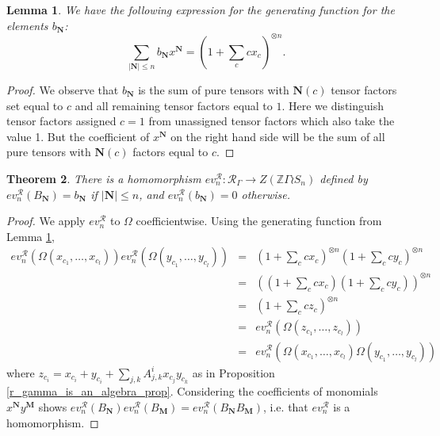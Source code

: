\documentclass[10pt]{article}
\newtheorem{theorem}{Theorem}[section]
\newtheorem{lemma}[theorem]{Lemma}
\theoremstyle{definition}
\newcommand{\RGamma}{\mathcal{R}_{\Gamma}}
\begin{document}
\begin{lemma} \label{specialised_gen_fun_lemma}
We have the following expression for the generating function for the elements $b_{\mathbf{N}}$:
\[
\sum_{|\mathbf{N}| \leq n} b_{\mathbf{N}} x^{\mathbf{N}} = (1 + \sum_c c x_c)^{\otimes n}.
\]
\end{lemma}

\begin{proof}
We observe that $b_{\mathbf{N}}$ is the sum of pure tensors with $\mathbf{N}(c)$ tensor factors set equal to $c$ and all remaining tensor factors equal to $1$. Here we distinguish tensor factors assigned $c=1$ from unassigned tensor factors which also take the value 1. But the coefficient of $x^{\mathbf{N}}$ on the right hand side will be the sum of all pure tensors with $\mathbf{N}(c)$ factors equal to $c$. 
\end{proof}


\begin{theorem} \label{r_gamma_hom_thm}
There is a homomorphism $ev_n^{\mathcal{R}}: \RGamma \to Z(\mathbb{Z} \Gamma \wr S_n)$ defined by $ev_n^{\mathcal{R}}(B_{\mathbf{N}}) = b_{\mathbf{N}}$ if $|\mathbf{N}| \leq n$, and $ev_n^{\mathcal{R}}(b_{\mathbf{N}}) = 0$ otherwise.
\end{theorem}

\begin{proof}
We apply $ev_n^{\mathcal{R}}$ to $\Omega$ coefficientwise.
Using the generating function from Lemma \ref{specialised_gen_fun_lemma},
\begin{eqnarray*}
ev_n^{\mathcal{R}}(\Omega(x_{c_1}, \ldots, x_{c_l}))ev_n^{\mathcal{R}}( \Omega(y_{c_1}, \ldots, y_{c_l})) &=& 
(1 + \sum_c cx_c)^{\otimes n} (1 + \sum_c c y_c)^{\otimes n} \\
&=& ((1 + \sum_c cx_c)(1 + \sum_c c y_c))^{\otimes n} \\
&=& (1 + \sum_c c z_c)^{\otimes n} \\
&=& ev_n^{\mathcal{R}}(\Omega(z_{c_1}, \ldots, z_{c_l})) \\
&=& ev_n^{\mathcal{R}}(\Omega(x_{c_1}, \ldots, x_{c_l})\Omega(y_{c_1}, \ldots, y_{c_l}))
\end{eqnarray*}
where $z_{c_i} = x_{c_i} + y_{c_i} + \sum_{j,k}A_{j,k}^{i} x_{c_j} y_{c_k}$ as in Proposition \ref{r_gamma_is_an_algebra_prop}. Considering the coefficients of monomials $x^{\mathbf{N}}y^{\mathbf{M}}$ shows $ev_n^{\mathcal{R}}(B_{\mathbf{N}})ev_n^{\mathcal{R}}(B_{\mathbf{M}}) = ev_n^{\mathcal{R}}(B_{\mathbf{N}}B_{\mathbf{M}})$, i.e. that $ev_n^{\mathcal{R}}$ is a homomorphism.
\end{proof}
\end{document}
